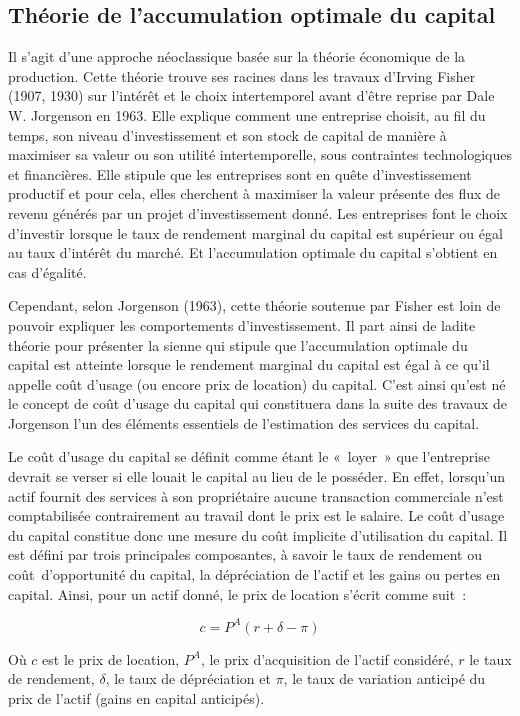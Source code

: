 \documentclass[12pt,a4paper,oneside]{report}
\begin{document}
\subsection{Théorie de l’accumulation optimale du capital}

Il s’agit d’une approche néoclassique basée sur la théorie économique de la production. Cette théorie trouve
ses racines dans les travaux d’Irving Fisher (1907, 1930) sur l’intérêt et le choix intertemporel avant d’être
reprise par Dale W. Jorgenson en 1963. Elle explique comment une entreprise choisit, au fil du temps, son
niveau d’investissement et son stock de capital de manière à maximiser sa valeur ou son utilité
intertemporelle, sous contraintes technologiques et financières. Elle stipule que les entreprises sont en
quête d’investissement productif et pour cela, elles cherchent à maximiser la valeur présente des flux de
revenu générés par un projet d’investissement donné. Les entreprises font le choix d’investir lorsque le taux
de rendement marginal du capital est supérieur ou égal au taux d’intérêt du marché. Et l’accumulation optimale
du capital s’obtient en cas d’égalité.

Cependant, selon Jorgenson (1963), cette théorie soutenue par Fisher est loin de pouvoir expliquer les
comportements d’investissement. Il part ainsi de ladite théorie pour présenter la sienne qui stipule que
l’accumulation optimale du capital est atteinte lorsque le rendement marginal du capital est égal à ce qu’il
appelle coût d’usage (ou encore prix de location) du capital. C’est ainsi qu’est né le concept de coût d’usage
du capital qui constituera dans la suite des travaux de Jorgenson l’un des éléments essentiels de l’estimation
des services du capital.

Le coût d’usage du capital se définit comme étant le «~loyer~» que l’entreprise devrait se verser si elle
louait le capital au lieu de le posséder. En effet, lorsqu’un actif fournit des services à son propriétaire
aucune transaction commerciale n’est comptabilisée contrairement au travail dont le prix est le salaire. Le
coût d’usage du capital constitue donc une mesure du coût implicite d’utilisation du capital. Il est défini
par trois principales composantes, à savoir le taux de rendement ou coût~d’opportunité du capital, la
dépréciation de l’actif et les gains ou pertes en capital. Ainsi, pour un actif donné, le prix de location
s’écrit comme suit~:

\[
c=P^{A}(r+\delta -\pi )
\]

Où \(c\) est le prix de location, \(P^{A}\), le prix d’acquisition de l’actif considéré, \(r\) le taux de
rendement, \(\delta \), le taux de dépréciation et \(\pi \), le taux de variation anticipé du prix de l’actif
(gains en capital anticipés).
\end{document}
